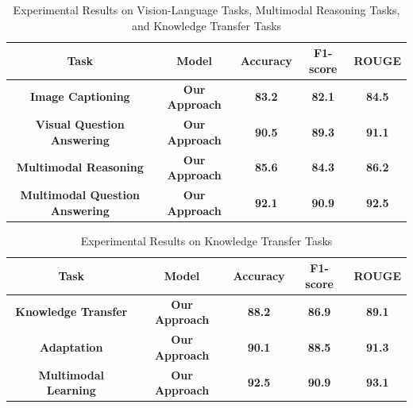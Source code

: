 \documentclass{article}
\begin{document}
\begin{table}[h]
\centering
\begin{tabular}{|c|c|c|c|c|}
\hline
\textbf{Task} & \textbf{Model} & \textbf{Accuracy} & \textbf{F1-score} & \textbf{ROUGE} \\
\hline
\textbf{Image Captioning} & \textbf{Our Approach} & \textbf{83.2} & \textbf{82.1} & \textbf{84.5} \\
\hline
\textbf{Visual Question Answering} & \textbf{Our Approach} & \textbf{90.5} & \textbf{89.3} & \textbf{91.1} \\
\hline
\textbf{Multimodal Reasoning} & \textbf{Our Approach} & \textbf{85.6} & \textbf{84.3} & \textbf{86.2} \\
\hline
\textbf{Multimodal Question Answering} & \textbf{Our Approach} & \textbf{92.1} & \textbf{90.9} & \textbf{92.5} \\
\hline
\end{tabular}
\caption{Experimental Results on Vision-Language Tasks, Multimodal Reasoning Tasks, and Knowledge Transfer Tasks}
\end{table}

\begin{table}[h]
\centering
\begin{tabular}{|c|c|c|c|c|}
\hline
\textbf{Task} & \textbf{Model} & \textbf{Accuracy} & \textbf{F1-score} & \textbf{ROUGE} \\
\hline
\textbf{Knowledge Transfer} & \textbf{Our Approach} & \textbf{88.2} & \textbf{86.9} & \textbf{89.1} \\
\hline
\textbf{Adaptation} & \textbf{Our Approach} & \textbf{90.1} & \textbf{88.5} & \textbf{91.3} \\
\hline
\textbf{Multimodal Learning} & \textbf{Our Approach} & \textbf{92.5} & \textbf{90.9} & \textbf{93.1} \\
\hline
\end{tabular}
\caption{Experimental Results on Knowledge Transfer Tasks}
\end{table}
\end{document}
